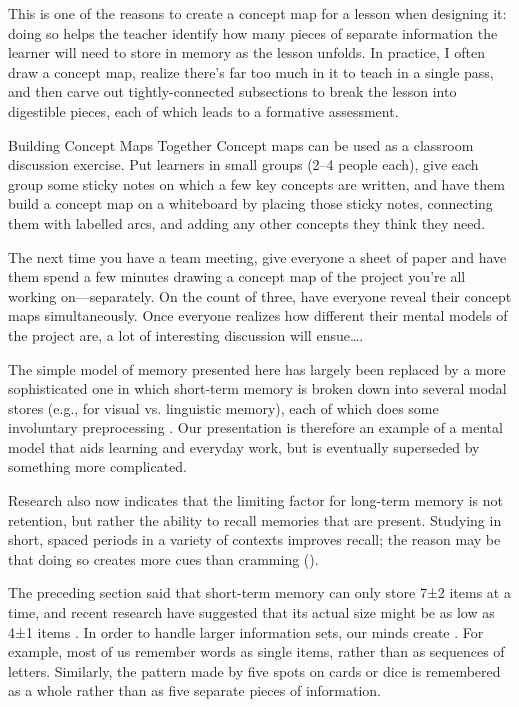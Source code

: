 This is one of the reasons to create a concept map for a lesson when
designing it: doing so helps the teacher identify how many pieces of
separate information the learner will need to store in memory as the
lesson unfolds. In practice, I often draw a concept map, realize there's
far too much in it to teach in a single pass, and then carve out
tightly-connected subsections to break the lesson into digestible
pieces, each of which leads to a formative assessment.

\begin{aside}{Building Concept Maps Together}
  Concept maps can be used as a classroom discussion exercise. Put
  learners in small groups (2--4 people each), give each group some
  sticky notes on which a few key concepts are written, and have them
  build a concept map on a whiteboard by placing those sticky notes,
  connecting them with labelled arcs, and adding any other concepts they
  think they need.

  The next time you have a team meeting, give everyone a sheet of paper
  and have them spend a few minutes drawing a concept map of the project
  you're all working on---separately. On the count of three, have everyone
  reveal their concept maps simultaneously. Once everyone realizes how
  different their mental models of the project are, a lot of interesting
  discussion will ensue{\ldots}.
\end{aside}

The simple model of memory presented here has largely been replaced by a
more sophisticated one in which short-term memory is broken down into
several modal stores (e.g., for visual vs. linguistic memory), each of
which does some involuntary preprocessing \cite{Mill2016a}. Our
presentation is therefore an example of a mental model that aids
learning and everyday work, but is eventually superseded by something
more complicated.

Research also now indicates that the limiting factor for long-term
memory is not retention, but rather the ability to recall memories that
are present. Studying in short, spaced periods in a variety of contexts
improves recall; the reason may be that doing so creates more cues than
cramming ().


The preceding section said that short-term memory can only store
7±2 items at a time, and recent research have suggested that its
actual size might be as low as 4±1 items \cite{Dida2016}. In
order to handle larger information sets, our minds create
. For example, most of us remember words
as single items, rather than as sequences of letters. Similarly, the
pattern made by five spots on cards or dice is remembered as a whole
rather than as five separate pieces of information.

